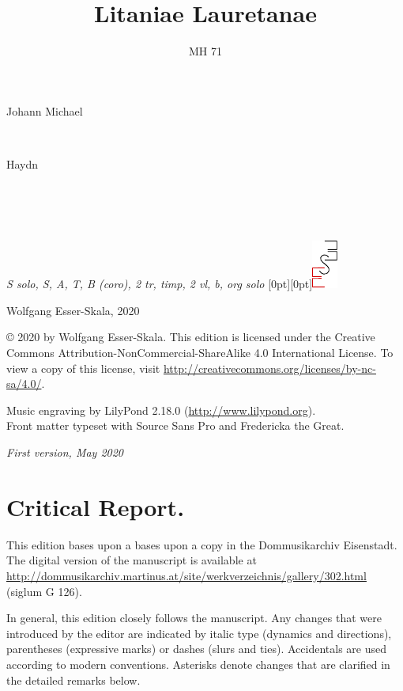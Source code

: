 \documentclass[parskip=full]{scrreprt}
\makeatletter
\DeclareRobustCommand{\sbseries}{\fontseries{sb}\selectfont}
\newcommand\fancytitlehead{
	\headingfont%
	\fontsize{80}{80}\selectfont\textcolor{black!80}{\@lastname.}\\[15pt]%
	\fontsize{60}{60}\selectfont\@ifundefined{@shorttitle}{\@title}{\@shorttitle}.%
}
\def\firstname#1{\def\@firstname{#1}}
\def\lastname#1{\def\@lastname{#1}}
\def\shorttitle#1{\def\@shorttitle{#1}}
\def\instrumentation#1{\def\@instrumentation{#1}}
\def\maketitle{%
\begin{titlepage}%
	\Large%
	{\@titlehead}%
	\vfill%
	{\strut\@firstname}\\%
	{\sbseries\color{oldred}\strut\@lastname}\\%
	{\strut\@namesuffix}%
	\vfill%
	{\sbseries\@title}\\%
	{\@subtitle}\\[\baselineskip]%
	{\itshape\@instrumentation}%
	\vfill%
	{\itshape\@parts}\hspace*{\fill}\raisebox{0pt}[0pt][0pt]{\includegraphics{ees_logo}}%
\end{titlepage}%
}
\newif\ifprintreport\printreportfalse
\makeatother
\begin{document}
\titlehead{\fancytitlehead}
\firstname{Johann Michael}
\lastname{Haydn}
\title{Litaniae Lauretanae}
\shorttitle{Lit: Lauretanae}
\subtitle{MH 71}
\instrumentation{S solo, S, A, T, B (coro), 2 tr, timp, 2 vl, b, org solo}
\maketitle


\thispagestyle{empty}

\vspace*{\fill}

\hspace*{1em}Wolfgang Esser-Skala, 2020

© 2020 by Wolfgang Esser-Skala. This edition is licensed under the Creative Commons Attribution-NonCommercial-ShareAlike 4.0 International License. To view a copy of this license, visit \url{http://creativecommons.org/licenses/by-nc-sa/4.0/}. 

Music engraving by LilyPond 2.18.0 (\url{http://www.lilypond.org}).\\
Front matter typeset with Source Sans Pro and Fredericka the Great.

\textit{First version, May 2020}

\vspace*{2cm}

\ifprintreport
\chapter*{Critical Report.}

This edition bases upon a bases upon a copy in the Dommusikarchiv Eisenstadt. The digital version of the manuscript is available at \url{http://dommusikarchiv.martinus.at/site/werkverzeichnis/gallery/302.html} (siglum G 126).

In general, this edition closely follows the manuscript. Any changes that were introduced by the editor are indicated by italic type (dynamics and directions), parentheses (expressive marks) or dashes (slurs and ties). Accidentals are used according to modern conventions. Asterisks denote changes that are clarified in the detailed remarks below.

\bigskip
\end{document}
